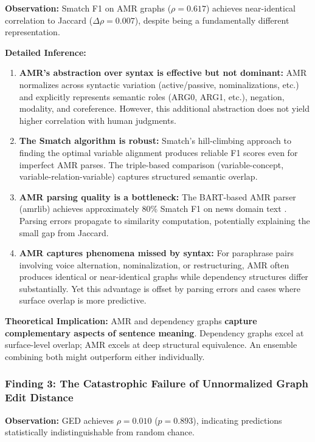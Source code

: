 \documentclass[11pt,a4paper]{article}
\begin{document}
\textbf{Observation:} Smatch F1 on AMR graphs ($\rho = 0.617$) achieves near-identical correlation to Jaccard ($\Delta\rho = 0.007$), despite being a fundamentally different representation.

\textbf{Detailed Inference:}
\begin{enumerate}
    \item \textbf{AMR's abstraction over syntax is effective but not dominant:} AMR normalizes across syntactic variation (active/passive, nominalizations, etc.) and explicitly represents semantic roles (ARG0, ARG1, etc.), negation, modality, and coreference. However, this additional abstraction does not yield higher correlation with human judgments.
    
    \item \textbf{The Smatch algorithm is robust:} Smatch's hill-climbing approach to finding the optimal variable alignment produces reliable F1 scores even for imperfect AMR parses. The triple-based comparison (variable-concept, variable-relation-variable) captures structured semantic overlap.
    
    \item \textbf{AMR parsing quality is a bottleneck:} The BART-based AMR parser (amrlib) achieves approximately 80\% Smatch F1 on news domain text \cite{lee2020pushing}. Parsing errors propagate to similarity computation, potentially explaining the small gap from Jaccard.
    
    \item \textbf{AMR captures phenomena missed by syntax:} For paraphrase pairs involving voice alternation, nominalization, or restructuring, AMR often produces identical or near-identical graphs while dependency structures differ substantially. Yet this advantage is offset by parsing errors and cases where surface overlap is more predictive.
\end{enumerate}

\textbf{Theoretical Implication:} AMR and dependency graphs \textbf{capture complementary aspects of sentence meaning}. Dependency graphs excel at surface-level overlap; AMR excels at deep structural equivalence. An ensemble combining both might outperform either individually.

\subsubsection{Finding 3: The Catastrophic Failure of Unnormalized Graph Edit Distance}

\textbf{Observation:} GED achieves $\rho = 0.010$ ($p = 0.893$), indicating predictions statistically indistinguishable from random chance.
\end{document}
